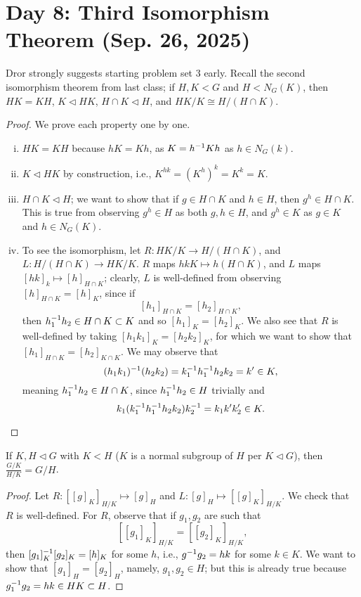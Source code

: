 \section{Day 8: Third Isomorphism Theorem (Sep. 26, 2025)}
Dror strongly suggests starting problem set 3 early. Recall the second isomorphism theorem from last class; if $H, K < G$ and $H < N_G(K)$, then $HK = KH$, $K \lhd HK$, $H \cap K \lhd H$, and $HK/K \cong H/(H \cap K)$.
\begin{proof}
    We prove each property one by one.
    \begin{enumerate}[(i)]
        \item $HK = KH$ because $hK = Kh$, as $K = h ^{-1} K h$ as $h \in N_G(k)$.
        \item $K \lhd HK$ by construction, i.e., $K^{hk} = (K^h)^k = K^k = K$.
        \item $H \cap K \lhd H$; we want to show that if $g \in H \cap K$ and $h \in H$, then $g^h \in H \cap K$. This is true from observing $g^h \in H$ as both $g, h \in H$, and $g^h \in K$ as $g \in K$ and $h \in N_G(K)$.
        \item To see the isomorphism, let $R : HK/K \to H/(H \cap K)$, and $L : H/(H \cap K) \to HK/K$. $R$ maps $hk K \mapsto h(H \cap K)$, and $L$ maps $[hk]_k \mapsto [h]_{H \cap K}$; clearly, $L$ is well-defined from observing $[h]_{H \cap K} = [h]_K$, since if
        \[ [h_1]_{H \cap K} = [h_2]_{H \cap K}, \]
        then $h_1 ^{-1} h_2 \in H \cap K \subset K$ and so $[h_1]_K = [h_2]_K$. We also see that $R$ is well-defined by taking $[h_1k_1]_K = [h_2k_2]_K$, for which we want to show that $[h_1]_{H \cap K} = [h_2]_{K \cap K}$. We may observe that
        \[ (h_1k_1)^{-1} (h_2k_2) = k_1^{-1} h_1^{-1} h_2 k_2 = k' \in K, \]
        meaning $h_1^{-1} h_2 \in H \cap K$, since $h_1^{-1} h_2 \in H$ trivially and
        \[ k_1 (k_1^{-1} h_1^{-1} h_2 k_2) k_2^{-1} = k_1 k' k_2' \in K. \qedhere \]
    \end{enumerate}
\end{proof}
\begin{theorem}
    If $K, H \lhd G$ with $K < H$ ($K$ is a normal subgroup of $H$ per $K \lhd G$), then $\frac{G/K}{H/K} = G/H$.
\end{theorem}
\begin{proof}
    Let $R : [[g]_K]_{H/K} \mapsto [g]_H$ and $L : [g]_H \mapsto [[g]_K]_{H/K}$. We check that $R$ is well-defined. For $R$, observe that if $g_1, g_2$ are such that
    \[ [[g_1]_K]_{H/K} = [[g_2]_K]_{H/K}, \]
    then $[g_1]_K^{-1} [g_2]_K = [h]_K$ for some $h$, i.e., $g^{-1} g_2 = hk$ for some $k \in K$. We want to show that $[g_1]_H = [g_2]_H$, namely, $g_1, g_2 \in H$; but this is already true because $g_1^{-1} g_2 = hk \in HK \subset H$.
\end{proof}
